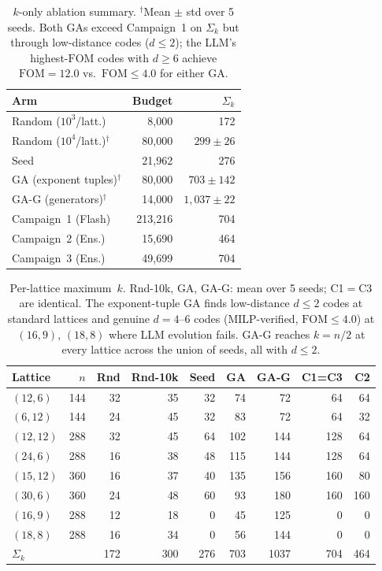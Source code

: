 \documentclass[aps,prxquantum,twocolumn,superscriptaddress,nofootinbib]{revtex4-2}
\newcommand{\FOM}{\ensuremath{\mathrm{FOM}}}
\begin{document}
\begin{table}[h]
\centering
\caption{$k$-only ablation summary.
$^\dagger$Mean $\pm$ std over 5 seeds.
Both GAs exceed Campaign~1 on $\Sigma_k$ but through low-distance codes ($d \leq 2$); the LLM's highest-$\FOM$ codes with $d \geq 6$ achieve $\FOM = 12.0$ vs.\ $\FOM \leq 4.0$ for either GA.} 
\label{tab:ablation_k}
\small
\begin{tabular}{@{}lrr@{}}
\toprule
Arm & Budget & $\Sigma_k$ \\
\midrule
Random ($10^3$/latt.) & 8{,}000 & 172 \\
Random ($10^4$/latt.)$^\dagger$ & 80{,}000 & $299 \pm 26$ \\
Seed & 21{,}962 & 276 \\
GA (exponent tuples)$^\dagger$ & 80{,}000 & $703 \pm 142$ \\
GA-G (generators)$^\dagger$ & 14{,}000 & $1{,}037 \pm 22$ \\
\midrule
Campaign~1 (Flash) & 213{,}216 & 704 \\
Campaign~2 (Ens.) & 15{,}690 & 464 \\
Campaign~3 (Ens.) & 49{,}699 & 704 \\
\bottomrule
\end{tabular}
\end{table}

\begin{table}[h]
\centering
\caption{Per-lattice maximum~$k$.
Rnd-10k, GA, GA-G: mean over 5 seeds; C1$=$C3 are identical.
The exponent-tuple GA finds low-distance $d \leq 2$ codes at standard lattices and genuine $d = 4$--$6$ codes (MILP-verified, $\FOM \leq 4.0$) at $(16,9)$, $(18,8)$ where LLM evolution fails.
GA-G reaches $k = n/2$ at every lattice across the union of seeds, all with $d \leq 2$.}
\label{tab:ablation_per_lattice}
\small
\begin{tabular}{@{}lrrrrrrrr@{}}
\toprule
Lattice & $n$ & Rnd & Rnd-10k & Seed & GA & GA-G & C1{=}C3 & C2 \\
\midrule
$(12,6)$ & 144 & 32 & 35 & 32 & 74 & 72 & 64 & 64 \\
$(6,12)$ & 144 & 24 & 45 & 32 & 83 & 72 & 64 & 32 \\
$(12,12)$ & 288 & 32 & 45 & 64 & 102 & 144 & 128 & 64 \\
$(24,6)$ & 288 & 16 & 38 & 48 & 115 & 144 & 128 & 64 \\
$(15,12)$ & 360 & 16 & 37 & 40 & 135 & 156 & 160 & 80 \\
$(30,6)$ & 360 & 24 & 48 & 60 & 93 & 180 & 160 & 160 \\
$(16,9)$ & 288 & 12 & 18 & 0 & 45 & 125 & 0 & 0 \\
$(18,8)$ & 288 & 16 & 34 & 0 & 56 & 144 & 0 & 0 \\
\midrule
$\Sigma_k$ & & 172 & 300 & 276 & 703 & 1037 & 704 & 464 \\
\bottomrule
\end{tabular}
\end{table}
\end{document}

